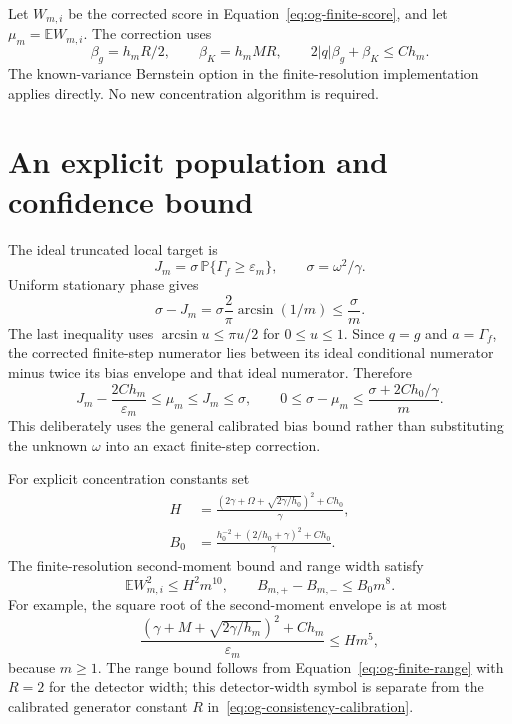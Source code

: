 Let $W_{m,i}$ be the corrected score in
Equation~\eqref{eq:og-finite-score}, and let $\mu_m=\mathbb E W_{m,i}$.
The correction uses
\[
 \beta_g=h_m R/2,\qquad \beta_K=h_mMR,
 \qquad 2|q|\beta_g+\beta_K\leq Ch_m.
\]
The known-variance Bernstein option in the finite-resolution implementation
applies directly. No new concentration algorithm is required.

\section{An explicit population and confidence bound}

The ideal truncated local target is
\[
 J_m=\sigma\,\mathbb P\{\Gamma_f\geq\varepsilon_m\},
 \qquad \sigma=\omega^2/\gamma.
\]
Uniform stationary phase gives
\begin{equation}
 \sigma-J_m
 =\sigma\frac2\pi\arcsin(1/m)\leq\frac{\sigma}{m}.
 \label{eq:og-consistency-tail}
\end{equation}
The last inequality uses $\arcsin u\leq\pi u/2$ for $0\leq u\leq1$.
Since $q=g$ and $a=\Gamma_f$, the corrected finite-step numerator lies
between its ideal conditional numerator minus twice its bias envelope and
that ideal numerator. Therefore
\begin{equation}
 J_m-\frac{2Ch_m}{\varepsilon_m}
 \leq\mu_m\leq J_m\leq\sigma,
 \qquad
 0\leq\sigma-\mu_m
 \leq\frac{\sigma+2Ch_0/\gamma}{m}.
 \label{eq:og-consistency-population}
\end{equation}
This deliberately uses the general calibrated bias bound rather than
substituting the unknown $\omega$ into an exact finite-step correction.

For explicit concentration constants set
\begin{align}
 H&=\frac{(2\gamma+\Omega+\sqrt{2\gamma/h_0})^2+Ch_0}{\gamma},\\
 B_0&=\frac{h_0^{-2}+(2/h_0+\gamma)^2+Ch_0}{\gamma}.
 \label{eq:og-consistency-constants}
\end{align}
The finite-resolution second-moment bound and range width satisfy
\begin{equation}
 \mathbb E W_{m,i}^2\leq H^2m^{10},\qquad
 B_{m,+}-B_{m,-}\leq B_0m^8.
 \label{eq:og-consistency-moments}
\end{equation}
For example, the square root of the second-moment envelope is at most
\[
 \frac{(\gamma+M+\sqrt{2\gamma/h_m})^2+Ch_m}{\varepsilon_m}
 \leq Hm^5,
\]
because $m\geq1$. The range bound follows from
Equation~\eqref{eq:og-finite-range} with $R=2$ for the detector width;
this detector-width symbol is separate from the calibrated generator
constant $R$ in~\eqref{eq:og-consistency-calibration}.


